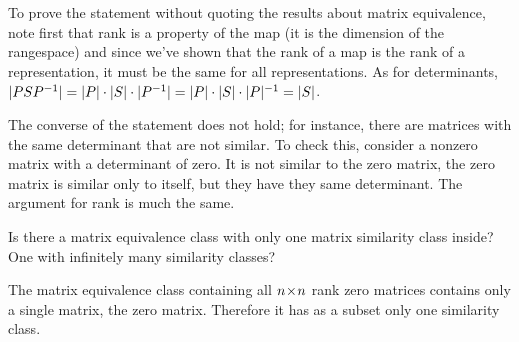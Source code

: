 \begin{exercises}
\begin{answer}
       To prove the statement without quoting the results about
       matrix equivalence, note first that
       rank is a property of the map (it is the dimension of the rangespace)
       and since we've shown that 
       the rank of a map is the rank of a representation,
       it must be the same for all representations.
       As for determinants,
       \( \deter{PSP^{-1}}=\deter{P}\cdot\deter{S}\cdot\deter{P^{-1}}
          =\deter{P}\cdot\deter{S}\cdot\deter{P}^{-1}=\deter{S} \).

       The converse of the statement does not hold; 
       for instance,
       there are matrices with the same determinant that are not similar.
       To check this, consider a nonzero matrix with a
       determinant of zero.
       It is not similar to the zero matrix, the zero matrix is similar
       only to itself, but they have they same determinant. 
       The argument for rank is much the same. 
     \end{answer}
  \item 
    Is there a matrix equivalence class with only one matrix similarity
    class inside?
    One with infinitely many similarity classes?
    \begin{answer}
      The matrix equivalence class containing all \( n \! \times \! n \) rank
      zero matrices contains only a single matrix, the zero matrix.
      Therefore it has as a subset only one similarity class.


\end{answer}
\end{exercises}
